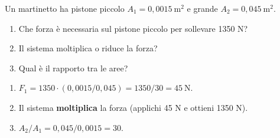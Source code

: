 \begin{question}[ID=4.5, subtitle={Martinetto idraulico: forza, rapporto aree e moltiplicazione}, tags={fluidi, Pascal, martinetto}, difficulty=media]
Un martinetto ha pistone piccolo $A_1 = 0{,}0015\ \mathrm{m^2}$ e grande $A_2 = 0{,}045\ \mathrm{m^2}$.
\begin{enumerate}
    \item Che forza è necessaria sul pistone piccolo per sollevare 1350 N?
    \item Il sistema moltiplica o riduce la forza?
    \item Qual è il rapporto tra le aree?
\end{enumerate}
\begin{solution}
\begin{enumerate}
    \item $F_1 = 1350\cdot(0{,}0015/0{,}045) = 1350/30 = 45\ \mathrm{N}$.
    \item Il sistema \textbf{moltiplica} la forza (applichi 45 N e ottieni 1350 N).
    \item $A_2/A_1 = 0{,}045/0{,}0015 = 30$.
\end{enumerate}
\end{solution}
\end{question}

